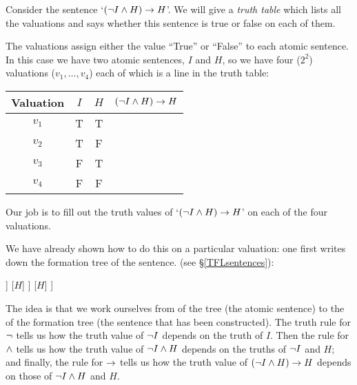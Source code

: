 Consider the sentence `$(\neg I\mathbin{\wedge} H)\rightarrow H$'. We will give a \emph{truth table} which lists all the valuations and says whether this sentence is true or false on each of them.

The valuations assign either the value ``True'' or ``False'' to each atomic sentence. In this case we have two atomic sentences, $I$ and $H$, so we have four ($2^2$) valuations ($v_1,\dots,v_4$) each of which is a line in the truth table:
\begin{center}
	\begin{tabular}{ccc|c}
		Valuation&$I$&$H$&$(\neg I\mathbin{\wedge} H)\rightarrow H$\\\hline
		$v_1$&T&T&\\
		$v_2$&T&F&\\
		$v_3$&F&T&\\
		$v_4$&F&F&
	\end{tabular}
\end{center}
Our job is to fill out the truth values of `$(\neg I\mathbin{\wedge} H)\rightarrow H$' on each of the four valuations.

We have already shown how to do this on a particular valuation: one first writes down the formation tree of the sentence. (see \S\ref{TFLsentences}):
\begin{center}
	\begin{forest}
		[$(\enot I\eand H)\mainconnective{\eif} H$
		[$(\enot I\mainconnective{\eand} H)$
		[$\mainconnective{\enot} I$
		[$I$]
		]
		[$H$]
		]
		[$H$]
		]
	\end{forest}
\end{center}
The idea is that we work ourselves from  of the tree (the atomic sentence) to the  of the formation tree (the sentence that has been constructed). The truth rule for $\neg$ tells us how the truth value of $\neg I$ depends on the truth of $I$. Then the rule for $\mathbin{\wedge}$ tells us how the truth value of $\neg I\mathbin{\wedge} H$ depends on the truths of $\neg I$ and $H$; and finally, the rule for $\rightarrow$ tells us how the truth value of $(\neg I\mathbin{\wedge} H)\rightarrow H$ depends on those of $\neg I\mathbin{\wedge} H$ and $H$.


